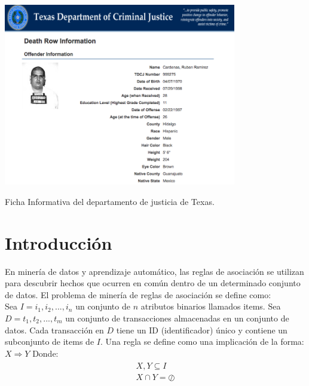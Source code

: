 \documentclass[sigconf]{acmart}
\begin{document}

\begin{teaserfigure}
  \centering
  \includegraphics[width=4.0in]{C.png}
  \caption{Ficha Informativa del departamento de justicia de Texas.}
\end{teaserfigure}

\maketitle



\section{Introducción}
En minería de datos y aprendizaje automático, las reglas de asociación se utilizan para descubrir hechos que ocurren en común dentro de un determinado conjunto de datos. El problema de minería de reglas de asociación se define como:\\
Sea $I={i_{1},i_{2},...,i_{n}}$ un conjunto de ${n}$ atributos binarios llamados items.
Sea $D={t_{1},t_{2},...,t_{m}}$ un conjunto de transacciones almacenadas en un conjunto de datos.
Cada transacción en $D$ tiene un ID (identificador) único y contiene un subconjunto de items de $I$. 
Una regla se define como una implicación de la forma: $X\Rightarrow Y$
Donde:
\begin{eqnarray*}
\begin{matrix}
X,Y\subseteq I \\
X\cap Y =\oslash
\end{matrix}
\end{eqnarray*}
\end{document}

